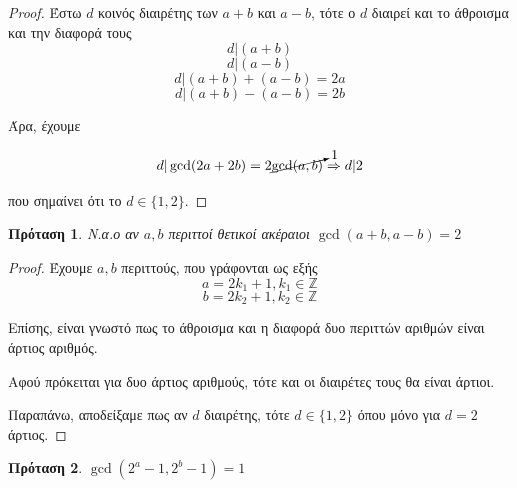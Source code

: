 \documentclass[oneside]{article}
\newtheorem*{lemma}{Πρόταση}
\begin{document}
\begin{proof}
    Έστω $d$ κοινός διαιρέτης των $a+b$ και $a-b$, τότε ο $d$ διαιρεί και το άθροισμα και την διαφορά τους
    \begin{equation*}
        d|(a+b)
    \end{equation*}
    \begin{equation*}
        d|(a-b)
    \end{equation*}
    \begin{equation*}
        d|(a+b) + (a-b) = 2a
    \end{equation*}
    \begin{equation*}
        d|(a+b) - (a-b) = 2b
    \end{equation*}

    Άρα, έχουμε

    \begin{equation}
        d|\gcd(2a+2b) = 2\cancelto{1}{\gcd(a,b)} \Rightarrow d|2
    \end{equation}

    που σημαίνει ότι το $d \in \{1,2\}$.
\end{proof}

\begin{lemma}
     Ν.α.ο αν $a,b$ περιττοί θετικοί ακέραιοι $\gcd(a+b,a-b) = 2$
\end{lemma}

\begin{proof}
    Έχουμε $a,b$ περιττούς, που γράφονται ως εξής
    \begin{equation*}
        a = 2k_1 + 1, k_1 \in \mathbb{Z}
    \end{equation*}
    \begin{equation*}
        b = 2k_2 + 1, k_2 \in \mathbb{Z}
    \end{equation*}

    Επίσης, είναι γνωστό πως το άθροισμα και η διαφορά δυο περιττών αριθμών είναι άρτιος αριθμός.

    Αφού πρόκειται για δυο άρτιος αριθμούς, τότε και οι διαιρέτες τους θα είναι άρτιοι.

    Παραπάνω, αποδείξαμε πως αν $d$ διαιρέτης, τότε $d \in \{1,2\}$ όπου μόνο για $d = 2$ άρτιος.
\end{proof}

\begin{lemma}
    $\gcd(2^a - 1, 2^b - 1) = 1$
\end{lemma}
\end{document}
